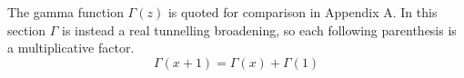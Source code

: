 \documentclass{article}
\begin{document}
The gamma function $\Gamma(z)$ is quoted for comparison in Appendix A.  In
this section $\Gamma$ is instead a real tunnelling broadening, so each
following parenthesis is a multiplicative factor.
\begin{equation}
  \Gamma(x+1)=\Gamma(x)+\Gamma(1)
\end{equation}
\end{document}
